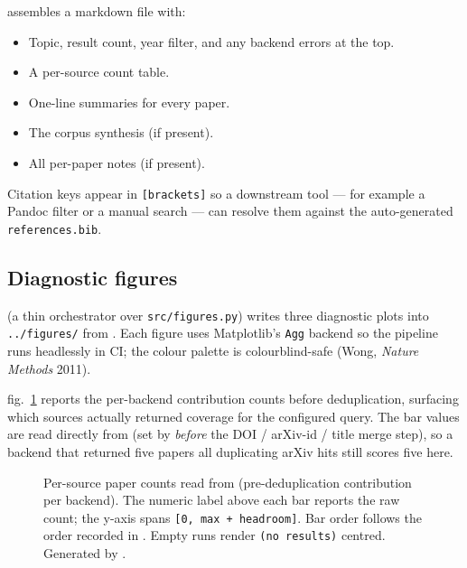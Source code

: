 \documentclass[
]{article}
\makeatletter
\newcommand*\pandocbounded[1]{%
  \sbox\pandoc@box{#1}%
  \Gscale@div\@tempa{\textheight}{\dimexpr\ht\pandoc@box+\dp\pandoc@box\relax}%
  \Gscale@div\@tempb{\linewidth}{\wd\pandoc@box}%
  \ifdim\@tempb\p@<\@tempa\p@\let\@tempa\@tempb\fi%
  \ifdim\@tempa\p@<\p@\scalebox{\@tempa}{\usebox\pandoc@box}%
  \else\usebox{\pandoc@box}%
  \fi%
}
\providecommand{\tightlist}{%
  \setlength{\itemsep}{0pt}\setlength{\parskip}{0pt}}
\makeatother
\begin{document}
 assembles a markdown file
with:

\begin{itemize}
\tightlist
\item
  Topic, result count, year filter, and any backend errors at the top.
\item
  A per-source count table.
\item
  One-line summaries for every paper.
\item
  The corpus synthesis (if present).
\item
  All per-paper notes (if present).
\end{itemize}

Citation keys appear in \texttt{{[}brackets{]}} so a downstream tool ---
for example a Pandoc filter or a manual search --- can resolve them
against the auto-generated \texttt{references.bib}.

\subsection{Diagnostic figures}\label{diagnostic-figures}

 (a thin orchestrator
over \texttt{src/figures.py}) writes three diagnostic plots into
\texttt{../figures/} from . Each
figure uses Matplotlib's \texttt{Agg} backend so the pipeline runs
headlessly in CI; the colour palette is colourblind-safe (Wong,
\emph{Nature Methods} 2011).

fig.~\ref{fig:papers_per_source} reports the per-backend contribution
counts before deduplication, surfacing which sources actually returned
coverage for the configured query. The bar values are read directly from
 (set by
 \emph{before} the DOI / arXiv-id / title merge
step), so a backend that returned five papers all duplicating arXiv hits
still scores five here.

\begin{figure}
\centering
\pandocbounded{\includegraphics[keepaspectratio,alt={Per-source paper counts read from SearchResult.per\_source\_counts (pre-deduplication contribution per backend). The numeric label above each bar reports the raw count; the y-axis spans {[}0, max + headroom{]}. Bar order follows the order recorded in config.search.sources. Empty runs render (no results) centred. Generated by src/figures.py::plot\_papers\_per\_source.}]{../figures/papers_per_source.png}}
\caption{Per-source paper counts read from
\protect{} (pre-deduplication
contribution per backend). The numeric label above each bar reports the
raw count; the y-axis spans \protect\texttt{{[}0,\ max\ +\ headroom{]}}.
Bar order follows the order recorded in
\protect{}. Empty runs render
\protect\texttt{(no\ results)} centred. Generated by
\protect{}.}\label{fig:papers_per_source}
\end{figure}
\end{document}
